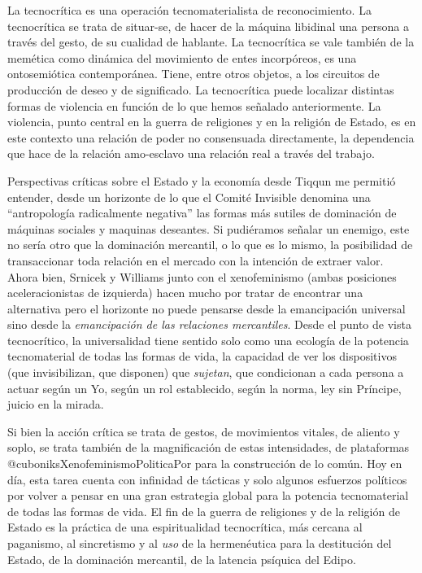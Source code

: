 La tecnocrítica es una operación tecnomaterialista de reconocimiento. La tecnocrítica se trata de situar-se, de hacer de la máquina libidinal una persona a través del gesto, de su cualidad de hablante. La tecnocrítica se vale también de la memética como dinámica del movimiento de entes incorpóreos, es una ontosemiótica contemporánea. Tiene, entre otros objetos, a los circuitos de producción de deseo y de significado. La tecnocrítica puede localizar distintas formas de violencia en función de lo que hemos señalado anteriormente. La violencia, punto central en la guerra de religiones y en la religión de Estado, es en este contexto una relación de poder no consensuada directamente, la dependencia que hace de la relación amo-esclavo una relación real a través del trabajo.

Perspectivas críticas sobre el Estado y la economía desde Tiqqun me permitió entender, desde un horizonte de lo que el Comité Invisible denomina una \enquote{antropología radicalmente negativa} las formas más sutiles de dominación de máquinas sociales y maquinas deseantes. Si pudiéramos señalar un enemigo, este no sería otro que la dominación mercantil, o lo que es lo mismo, la posibilidad de transaccionar toda relación en el mercado con la intención de extraer valor. Ahora bien, Srnicek y Williams junto con el xenofeminismo (ambas posiciones aceleracionistas de izquierda) hacen mucho por tratar de encontrar una alternativa pero el horizonte no puede pensarse desde la emancipación universal sino desde la \emph{emancipación de las relaciones mercantiles}. Desde el punto de vista tecnocrítico, la universalidad tiene sentido solo como una ecología de la potencia tecnomaterial de todas las formas de vida, la capacidad de ver los dispositivos (que invisibilizan, que disponen) que \emph{sujetan}, que condicionan a cada persona a actuar según un Yo, según un rol establecido, según la norma, ley sin Príncipe, juicio en la mirada.

Si bien la acción crítica se trata de gestos, de movimientos vitales, de aliento y soplo, se trata también de la magnificación de estas intensidades, de plataformas @cuboniksXenofeminismoPoliticaPor para la construcción de lo común. Hoy en día, esta tarea cuenta con infinidad de tácticas y solo algunos esfuerzos políticos por volver a pensar en una gran estrategia global para la potencia tecnomaterial de todas las formas de vida. El fin de la guerra de religiones y de la religión de Estado es la práctica de una espiritualidad tecnocrítica, más cercana al paganismo, al sincretismo y al \emph{uso} de la hermenéutica para la destitución del Estado, de la dominación mercantil, de la latencia psíquica del Edipo.

